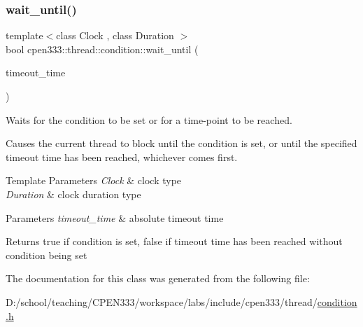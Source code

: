 \subsubsection{\texorpdfstring{wait\+\_\+until()}{wait\_until()}}
{\footnotesize\ttfamily template$<$class Clock , class Duration $>$ \\
bool cpen333\+::thread\+::condition\+::wait\+\_\+until (\begin{DoxyParamCaption}\item[{const std\+::chrono\+::time\+\_\+point$<$ Clock, Duration $>$ \&}]{timeout\+\_\+time }\end{DoxyParamCaption})\hspace{0.3cm}{\ttfamily [inline]}}



Waits for the condition to be set or for a time-\/point to be reached. 

Causes the current thread to block until the condition is set, or until the specified timeout time has been reached, whichever comes first.


\begin{DoxyTemplParams}{Template Parameters}
{\em Clock} & clock type \\
\hline
{\em Duration} & clock duration type \\
\hline
\end{DoxyTemplParams}

\begin{DoxyParams}{Parameters}
{\em timeout\+\_\+time} & absolute timeout time \\
\hline
\end{DoxyParams}
\begin{DoxyReturn}{Returns}
{\ttfamily true} if condition is set, {\ttfamily false} if timeout time has been reached without condition being set 
\end{DoxyReturn}


The documentation for this class was generated from the following file\+:\begin{DoxyCompactItemize}
\item 
D\+:/school/teaching/\+C\+P\+E\+N333/workspace/labs/include/cpen333/thread/\hyperlink{thread_2condition_8h}{condition.\+h}\end{DoxyCompactItemize}
